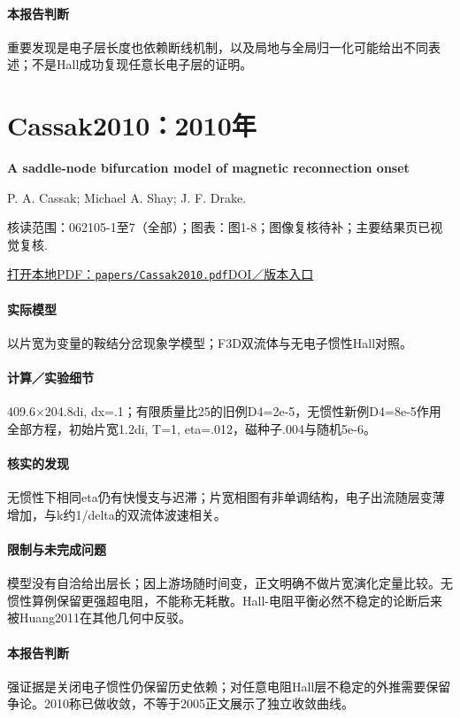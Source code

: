 \paragraph{本报告判断}重要发现是电子层长度也依赖断线机制，以及局地与全局归一化可能给出不同表述；不是Hall成功复现任意长电子层的证明。

\section{Cassak2010：2010年}\label{paper:Cassak2010}

\textbf{A saddle-node bifurcation model of magnetic reconnection onset}\citep{Cassak2010}\

P. A. Cassak;  Michael A. Shay;  J. F. Drake.

\textsf{核读范围：}062105-1至7（全部）；\textsf{图表：}图1-8；图像复核待补；主要结果页已视觉复核.

\href{run:papers/Cassak2010.pdf}{打开本地PDF：\texttt{papers/Cassak2010.pdf}}\quad\href{https://doi.org/10.1063/1.3435269}{DOI／版本入口}

\paragraph{实际模型}以片宽为变量的鞍结分岔现象学模型；F3D双流体与无电子惯性Hall对照。

\paragraph{计算／实验细节}409.6×204.8di, dx=.1；有限质量比25的旧例D4=2e-5，无惯性新例D4=8e-5作用全部方程，初始片宽1.2di, T=1, eta=.012，磁种子.004与随机5e-6。

\paragraph{核实的发现}无惯性下相同eta仍有快慢支与迟滞；片宽相图有非单调结构，电子出流随层变薄增加，与k约1/delta的双流体波速相关。

\paragraph{限制与未完成问题}模型没有自洽给出层长；因上游场随时间变，正文明确不做片宽演化定量比较。无惯性算例保留更强超电阻，不能称无耗散。Hall-电阻平衡必然不稳定的论断后来被Huang2011在其他几何中反驳。

\paragraph{本报告判断}强证据是关闭电子惯性仍保留历史依赖；对任意电阻Hall层不稳定的外推需要保留争论。2010称已做收敛，不等于2005正文展示了独立收敛曲线。

